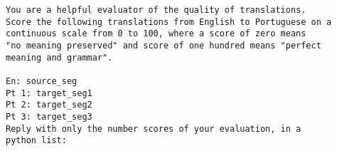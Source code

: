 \documentclass{article}
\begin{document}
\begin{verbatim}
You are a helpful evaluator of the quality of translations.
Score the following translations from English to Portuguese on a
continuous scale from 0 to 100, where a score of zero means
"no meaning preserved" and score of one hundred means "perfect
meaning and grammar".

En: source_seg
Pt 1: target_seg1
Pt 2: target_seg2
Pt 3: target_seg3
Reply with only the number scores of your evaluation, in a 
python list:
\end{verbatim}
\end{document}
